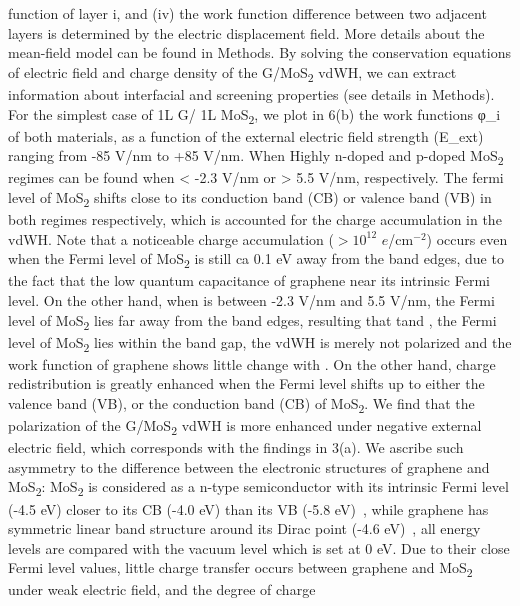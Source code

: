 function of layer i, and (iv) the work function difference between two
adjacent layers is determined by the electric displacement field. More
details about the mean-field model can be found in Methods. By solving
the conservation equations of electric field and charge density of the
G/MoS\textsubscript{2} vdWH, we can extract information about interfacial and
screening properties (see details in Methods). For the simplest case
of 1L G/ 1L MoS\textsubscript{2}, we plot in  6(b) the work functions φ\_i of
both materials, as a function of the external electric field strength
(E\_ext) ranging from -85 V/nm to +85 V/nm. When Highly n-doped and
p-doped MoS\textsubscript{2} regimes can be found when < -2.3 V/nm or > 5.5 V/nm,
respectively. The fermi level of MoS\textsubscript{2} shifts close to its conduction
band (CB) or valence band (VB) in both regimes respectively, which is
accounted for the charge accumulation in the vdWH. Note that a
noticeable charge accumulation ($>10^{12}$ $e$/cm$^{-2}$) occurs even when the
Fermi level of MoS\textsubscript{2} is still ca 0.1 eV away from the band edges, due
to the fact that the low quantum capacitance of graphene near its
intrinsic Fermi level. On the other hand, when is between -2.3 V/nm
and 5.5 V/nm, the Fermi level of MoS\textsubscript{2} lies far away from the band
edges, resulting that tand , the Fermi level of MoS\textsubscript{2} lies within the
band gap, the vdWH is merely not polarized and the work function of
graphene shows little change with . On the other hand, charge
redistribution is greatly enhanced when the Fermi level shifts up to
either the valence band (VB), or the conduction band (CB) of
MoS\textsubscript{2}. We find that the polarization of the G/MoS\textsubscript{2} vdWH is more
enhanced under negative external electric field, which corresponds
with the findings in  3(a). We ascribe such asymmetry to the
difference between the electronic structures of graphene and MoS\textsubscript{2}:
MoS\textsubscript{2} is considered as a n-type semiconductor with its intrinsic Fermi
level (-4.5 eV) closer to its CB (-4.0 eV) than its VB (-5.8
eV)~\cite{Ochedowski_2014_contami_mos2,Das_2012_high_perform,Lu_2014_midgap_mos2},
while graphene has symmetric linear band structure around its Dirac
point (-4.6 eV)~\cite{Das_Sarma_2011_electron_gr}, all energy levels
are compared with the vacuum level which is set at 0 eV.  Due to their
close Fermi level values, little charge transfer occurs between
graphene and MoS\textsubscript{2} under weak electric field, and the degree of charge
